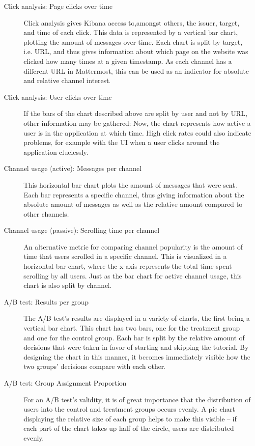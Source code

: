 \begin{description}
\item[Click analysis: Page clicks over time]
Click analysis gives Kibana access to,\linebreak amongst others, the issuer, target, and time of each click.
This data is represented by a vertical bar chart, plotting the amount of messages over time.
Each chart is split by target, i.e. URL, and thus gives information about which page on the website was clicked how many times at a given timestamp.
As each channel has a different URL in Mattermost, this can be used as an indicator for absolute and relative channel interest.

\item[Click analysis: User clicks over time]
If the bars of the chart described above are split by user and not by URL, other information may be gathered:
Now, the chart represents how active a user is in the application at which time.
High click rates could also indicate problems, for example with the UI when a user clicks around the application cluelessly.

\item[Channel usage (active): Messages per channel]  
This horizontal bar chart plots the amount of messages that were sent.
Each bar represents a specific channel, thus giving information about the absolute amount of messages as well as the relative amount compared to other channels.

\item[Channel usage (passive): Scrolling time per channel]  
An alternative metric for comparing channel popularity is the amount of time that users scrolled in a specific channel.
This is visualized in a horizontal bar chart, where the x-axis represents the total time spent scrolling by all users.
Just as the bar chart for active channel usage, this chart is also split by channel.

\item[A/B test: Results per group]
The A/B test's results are displayed in a variety of charts, the first being a vertical bar chart.
This chart has two bars, one for the treatment group and one for the control group.
Each bar is split by the relative amount of decisions that were taken in favor of starting and skipping the tutorial.
By designing the chart in this manner, it becomes immediately visible how the two groups' decisions compare with each other.

\item[A/B test: Group Assignment Proportion]
For an A/B test's validity, it is of great importance that the distribution of users into the control and treatment groups occurs evenly.
A pie chart displaying the relative size of each group helps to make this visible -- if each part of the chart takes up half of the circle, users are distributed evenly.


\end{description}

